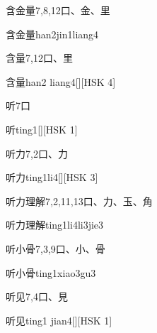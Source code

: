 \begin{entry}{含金量}{7,8,12}{⼝、⾦、⾥}
  \begin{phonetics}{含金量}{han2jin1liang4}
  \end{phonetics}
\end{entry}

\begin{entry}{含量}{7,12}{⼝、⾥}
  \begin{phonetics}{含量}{han2 liang4}[][HSK 4]
  \end{phonetics}
\end{entry}

\begin{entry}{听}{7}{⼝}
  \begin{phonetics}{听}{ting1}[][HSK 1]
  \end{phonetics}
\end{entry}

\begin{entry}{听力}{7,2}{⼝、⼒}
  \begin{phonetics}{听力}{ting1li4}[][HSK 3]
  \end{phonetics}
\end{entry}

\begin{entry}{听力理解}{7,2,11,13}{⼝、⼒、⽟、⾓}
  \begin{phonetics}{听力理解}{ting1li4li3jie3}
  \end{phonetics}
\end{entry}

\begin{entry}{听小骨}{7,3,9}{⼝、⼩、⾻}
  \begin{phonetics}{听小骨}{ting1xiao3gu3}
  \end{phonetics}
\end{entry}

\begin{entry}{听见}{7,4}{⼝、⾒}
  \begin{phonetics}{听见}{ting1 jian4}[][HSK 1]
  \end{phonetics}
\end{entry}

